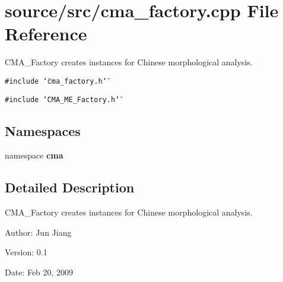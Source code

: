 \section{source/src/cma\_\-factory.cpp File Reference}
\label{cma__factory_8cpp}
CMA\_\-Factory creates instances for Chinese morphological analysis. 

{\tt \#include \char`\"{}cma\_\-factory.h\char`\"{}}\par
{\tt \#include \char`\"{}CMA\_\-ME\_\-Factory.h\char`\"{}}\par
\subsection*{Namespaces}
\begin{CompactItemize}
\item 
namespace \textbf{cma}
\end{CompactItemize}


\subsection{Detailed Description}
CMA\_\-Factory creates instances for Chinese morphological analysis. 

\begin{Desc}
\item[Author:]Jun Jiang \end{Desc}
\begin{Desc}
\item[Version:]0.1 \end{Desc}
\begin{Desc}
\item[Date:]Feb 20, 2009 \end{Desc}
